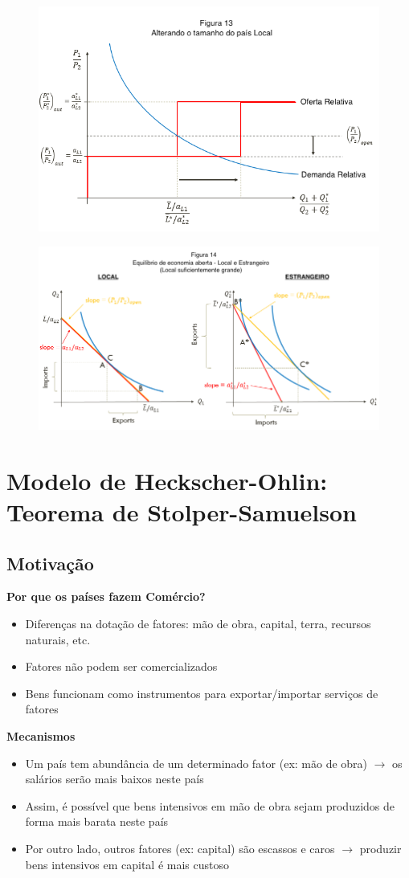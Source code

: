 \documentclass[a4paper,12pt]{article}[abntex2]
\begin{document}
\begin{figure}[H]
    \centering
    \includegraphics[width=0.7\linewidth]{Imagens/a9i15.png}
\end{figure}

\begin{figure}[H]
    \centering
    \includegraphics[width=0.7\linewidth]{Imagens/a9i16.png}
\end{figure}

\newpage
\section{\textbf{Modelo de Heckscher-Ohlin: Teorema de Stolper-Samuelson}}
\subsection{\textbf{Motivação}}
\textbf{Por  que  os  países  fazem  Comércio?}\begin{itemize}
    \item Diferenças na dotação de fatores: mão de obra, capital, terra, recursos naturais, etc.
    \item Fatores não podem ser comercializados
    \item Bens funcionam como instrumentos para exportar/importar serviços de fatores
\end{itemize}

\textbf{Mecanismos}\begin{itemize}
    \item Um país tem abundância de um determinado fator (ex: mão de obra) \(\rightarrow\) os salários serão mais baixos neste país
    \item Assim, é possível que bens intensivos em mão de obra sejam produzidos de forma mais barata neste país
    \item Por outro lado, outros fatores (ex: capital) são escassos e caros \(\rightarrow\) produzir bens intensivos em capital é mais custoso
\end{itemize}
\end{document}
